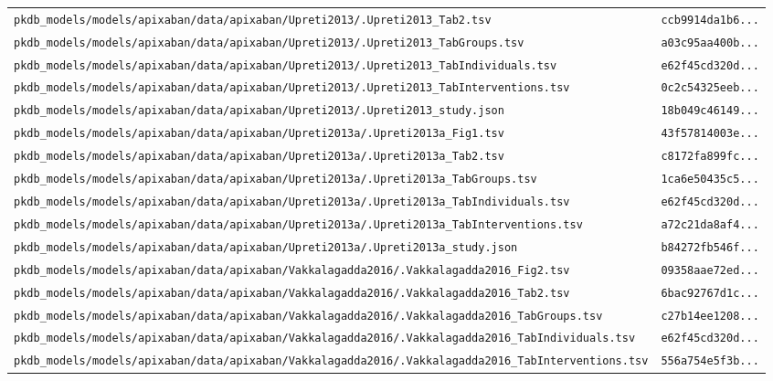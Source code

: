 \documentclass{article}
\begin{document}
\begin{longtable}{ll}
\texttt{pkdb\_models/models/apixaban/data/apixaban/Upreti2013/.Upreti2013\_Tab2.tsv} & \texttt{ccb9914da1b6...} \\
\texttt{pkdb\_models/models/apixaban/data/apixaban/Upreti2013/.Upreti2013\_TabGroups.tsv} & \texttt{a03c95aa400b...} \\
\texttt{pkdb\_models/models/apixaban/data/apixaban/Upreti2013/.Upreti2013\_TabIndividuals.tsv} & \texttt{e62f45cd320d...} \\
\texttt{pkdb\_models/models/apixaban/data/apixaban/Upreti2013/.Upreti2013\_TabInterventions.tsv} & \texttt{0c2c54325eeb...} \\
\texttt{pkdb\_models/models/apixaban/data/apixaban/Upreti2013/.Upreti2013\_study.json} & \texttt{18b049c46149...} \\
\texttt{pkdb\_models/models/apixaban/data/apixaban/Upreti2013a/.Upreti2013a\_Fig1.tsv} & \texttt{43f57814003e...} \\
\texttt{pkdb\_models/models/apixaban/data/apixaban/Upreti2013a/.Upreti2013a\_Tab2.tsv} & \texttt{c8172fa899fc...} \\
\texttt{pkdb\_models/models/apixaban/data/apixaban/Upreti2013a/.Upreti2013a\_TabGroups.tsv} & \texttt{1ca6e50435c5...} \\
\texttt{pkdb\_models/models/apixaban/data/apixaban/Upreti2013a/.Upreti2013a\_TabIndividuals.tsv} & \texttt{e62f45cd320d...} \\
\texttt{pkdb\_models/models/apixaban/data/apixaban/Upreti2013a/.Upreti2013a\_TabInterventions.tsv} & \texttt{a72c21da8af4...} \\
\texttt{pkdb\_models/models/apixaban/data/apixaban/Upreti2013a/.Upreti2013a\_study.json} & \texttt{b84272fb546f...} \\
\texttt{pkdb\_models/models/apixaban/data/apixaban/Vakkalagadda2016/.Vakkalagadda2016\_Fig2.tsv} & \texttt{09358aae72ed...} \\
\texttt{pkdb\_models/models/apixaban/data/apixaban/Vakkalagadda2016/.Vakkalagadda2016\_Tab2.tsv} & \texttt{6bac92767d1c...} \\
\texttt{pkdb\_models/models/apixaban/data/apixaban/Vakkalagadda2016/.Vakkalagadda2016\_TabGroups.tsv} & \texttt{c27b14ee1208...} \\
\texttt{pkdb\_models/models/apixaban/data/apixaban/Vakkalagadda2016/.Vakkalagadda2016\_TabIndividuals.tsv} & \texttt{e62f45cd320d...} \\
\texttt{pkdb\_models/models/apixaban/data/apixaban/Vakkalagadda2016/.Vakkalagadda2016\_TabInterventions.tsv} & \texttt{556a754e5f3b...} \\

\end{longtable}
\end{document}
